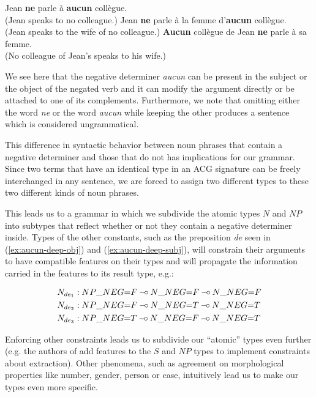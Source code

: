 \documentclass[twocolumn]{article}
\def\limp {\mathbin{{-}\mkern-3.5mu{\circ}}}
\begin{document}
\begin{exe}
  \ex \label{ex:aucun-shallow} Jean \textbf{ne} parle à \textbf{aucun} collègue. \\
      (Jean speaks to no colleague.)
  \ex \label{ex:aucun-deep-obj} Jean \textbf{ne} parle à la femme d'\textbf{aucun} collègue. \\
      (Jean speaks to the wife of no colleague.)
  \ex \label{ex:aucun-deep-subj} \textbf{Aucun} collègue de Jean \textbf{ne} parle à sa femme. \\
      (No colleague of Jean's speaks to his wife.)
\end{exe}

We see here that the negative determiner \emph{aucun} can be present in
the subject or the object of the negated verb and it can modify the
argument directly or be attached to one of its complements. Furthermore,
we note that omitting either the word \emph{ne} or the word \emph{aucun}
while keeping the other produces a sentence which is considered
ungrammatical.

This difference in syntactic behavior between noun phrases that contain a
negative determiner and those that do not has implications for our
grammar. Since two terms that have an identical type in an ACG signature can
be freely interchanged in any sentence, we are forced to assign two different
types to these two different kinds of noun phrases.


This leads us to a grammar in which we subdivide the atomic types $N$
and $NP$ into subtypes that reflect whether or not they contain a
negative determiner inside. Types of the other constants, such as the
preposition \emph{de} seen in (\ref{ex:aucun-deep-obj}) and
(\ref{ex:aucun-deep-subj}), will constrain their arguments to have
compatible features on their types and will propagate the information
carried in the features to its result type, e.g.:

\begin{align*}
N_{de_1} &: NP\_NEG{=}F \limp N\_NEG{=}F \limp N\_NEG{=}F \\
N_{de_2} &: NP\_NEG{=}F \limp N\_NEG{=}T \limp N\_NEG{=}T \\
N_{de_3} &: NP\_NEG{=}T \limp N\_NEG{=}F \limp N\_NEG{=}T
\end{align*}

Enforcing other constraints leads us to subdivide our ``atomic'' types
even further (e.g. the authors of \cite{pogodalla2012controlling} add
features to the $S$ and $NP$ types to implement constraints about
extraction). Other phenomena, such as agreement on morphological
properties like number, gender, person or case, intuitively lead us to
make our types even more specific.
\end{document}
